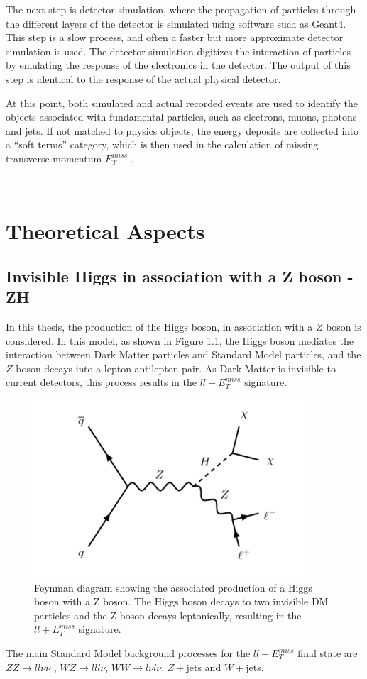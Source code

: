 \documentclass[11pt,a4paper,openright,twoside]{report}
\newcommand{\ZZ}{$ZZ\to ll\nu\nu$ }
\newcommand{\met}{$E_T^{miss}$ }
\begin{document}
The next step is detector simulation, where the propagation of particles through the different layers of the detector is simulated using software such as Geant4\cite{geant4}. This step is a slow process, and often a faster but more approximate detector simulation is used. The detector simulation digitizes the interaction of particles by emulating the response of the electronics in the detector. The output of this step is identical to the response of the actual physical detector.

At this point, both simulated and actual recorded events are used to identify the objects associated with fundamental particles, such as electrons, muons, photons and jets. If not matched to physics objects, the energy deposits are collected into a ``soft terms'' category, which is then used in the calculation of missing transverse momentum \met.

\

\chapter{Theoretical Aspects}\label{ch:theory}
\section{Invisible Higgs in association with a Z boson - ZH}
In this thesis, the production of the Higgs boson, in association with a $Z$ boson is considered. In this model, as shown in Figure \ref{fig:HZ}, the Higgs boson mediates the interaction between Dark Matter particles and Standard Model particles, and the $Z$ boson decays into a lepton-antilepton pair. As Dark Matter is invisible to current detectors, this process results in the $ll+$\met signature.
\begin{figure}[H]
\centering
	\includegraphics[width=0.5\linewidth]{HZ.png}
	\caption{Feynman diagram showing the associated production of a Higgs boson with a Z boson. The Higgs boson decays to two invisible DM particles and the Z boson decays leptonically, resulting in the $ll+ E_T^{miss}$ signature.}
		\label{fig:HZ}
\end{figure}
The main Standard Model background processes for the $ll+$\met final state are \ZZ, $WZ\to lll\nu$, $WW\to l\nu l\nu$, $Z+$jets and $W+$jets. 
\end{document}
